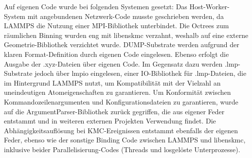 Auf eigenen Code wurde bei folgenden Systemen gesetzt:
Das Host-Worker-System mit angebundenen Netzwerk-Code musste geschrieben werden, da LAMMPS die Nutzung einer MPI-Bibliothek unterbindet.
Die Octrees zum räumlichen Binning wurden eng mit libenskmc verzahnt, weshalb auf eine externe Geometrie-Bibliothek verzichtet wurde.
DUMP-Substrate werden aufgrund der klaren Format-Definition durch eigenen Code eingelesen.
Ebenso erfolgt die Ausgabe der .xyz-Dateien über eigenen Code.
Im Gegensatz dazu werden .lmp-Substrate jedoch über lmpio eingelesen, einer IO-Bibliothek für .lmp-Dateien, die im Hintergrund LAMMPS nutzt, um Kompatibilität mit der Vielzahl an uneindeutigen Atomeigenschaften zu garantieren.
Um Konformität zwischen Kommandozeilenargumenten und Konfigurationsdateien zu garantieren, wurde auf die ArgumentParser-Bibliothek zurück gegriffen, die aus eigener Feder entstammt und in weiteren externen Projekten Verwendung findet.
Die Abhängigkeitsauflösung bei KMC-Ereignissen entstammt ebenfalls der eigenen Feder, ebenso wie der sonstige Binding Code zwischen LAMMPS und libenskmc, inklusive beider Parallelisierung-Codes (Threads und losgelöste Unterprozesse).
